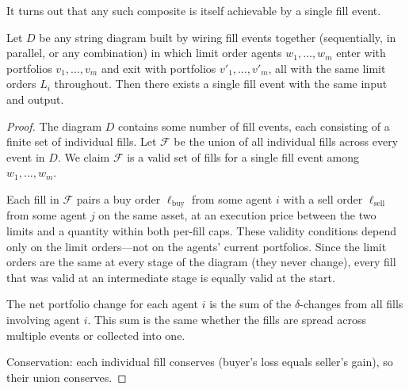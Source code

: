 \begin{center}
\end{center}

It turns out that any such composite is itself achievable by a single fill event.

\begin{proposition}\label{prop:fill-compose}
Let $D$ be any string diagram built by wiring fill events together (sequentially, in parallel, or any combination) in which limit order agents $w_1, \ldots, w_m$ enter with portfolios $v_1, \ldots, v_m$ and exit with portfolios $v'_1, \ldots, v'_m$, all with the same limit orders $L_i$ throughout.  Then there exists a single fill event with the same input and output.
\end{proposition}

\begin{proof}
The diagram $D$ contains some number of fill events, each consisting of a finite set of individual fills.  Let $\mathcal{F}$ be the union of all individual fills across every event in $D$.  We claim $\mathcal{F}$ is a valid set of fills for a single fill event among $w_1, \ldots, w_m$.

Each fill in $\mathcal{F}$ pairs a buy order $\ell_{\mathrm{buy}}$ from some agent $i$ with a sell order $\ell_{\mathrm{sell}}$ from some agent $j$ on the same asset, at an execution price between the two limits and a quantity within both per-fill caps.  These validity conditions depend only on the limit orders---not on the agents' current portfolios.  Since the limit orders are the same at every stage of the diagram (they never change), every fill that was valid at an intermediate stage is equally valid at the start.

The net portfolio change for each agent $i$ is the sum of the $\delta$-changes from all fills involving agent $i$.  This sum is the same whether the fills are spread across multiple events or collected into one.

Conservation: each individual fill conserves (buyer's loss equals seller's gain), so their union conserves.
\end{proof}

